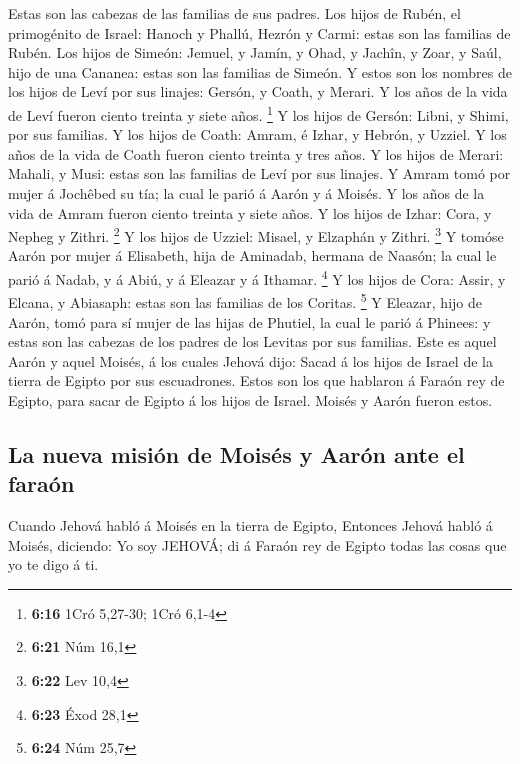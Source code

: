  Estas son las cabezas de las familias de sus padres. Los
hijos de Rubén, el primogénito de Israel: Hanoch y Phallú, Hezrón y
Carmi: estas son las familias de Rubén.  Los hijos de
Simeón: Jemuel, y Jamín, y Ohad, y Jachîn, y Zoar, y Saúl, hijo de una
Cananea: estas son las familias de Simeón.  Y estos son
los nombres de los hijos de Leví por sus linajes: Gersón, y Coath, y
Merari. Y los años de la vida de Leví fueron ciento treinta y siete
años. \footnote{\textbf{6:16} 1Cró 5,27-30; 1Cró 6,1-4} 
Y los hijos de Gersón: Libni, y Shimi, por sus familias. 
Y los hijos de Coath: Amram, é Izhar, y Hebrón, y Uzziel. Y los años de
la vida de Coath fueron ciento treinta y tres años.  Y
los hijos de Merari: Mahali, y Musi: estas son las familias de Leví por
sus linajes.  Y Amram tomó por mujer á Jochêbed su tía;
la cual le parió á Aarón y á Moisés. Y los años de la vida de Amram
fueron ciento treinta y siete años.  Y los hijos de
Izhar: Cora, y Nepheg y Zithri. \footnote{\textbf{6:21} Núm 16,1}
 Y los hijos de Uzziel: Misael, y Elzaphán y Zithri.
\footnote{\textbf{6:22} Lev 10,4}  Y tomóse Aarón por
mujer á Elisabeth, hija de Aminadab, hermana de Naasón; la cual le parió
á Nadab, y á Abiú, y á Eleazar y á Ithamar. \footnote{\textbf{6:23} Éxod
  28,1}  Y los hijos de Cora: Assir, y Elcana, y
Abiasaph: estas son las familias de los Coritas. \footnote{\textbf{6:24}
  Núm 25,7}  Y Eleazar, hijo de Aarón, tomó para sí mujer
de las hijas de Phutiel, la cual le parió á Phinees: y estas son las
cabezas de los padres de los Levitas por sus familias. 
Este es aquel Aarón y aquel Moisés, á los cuales Jehová dijo: Sacad á
los hijos de Israel de la tierra de Egipto por sus escuadrones.
 Estos son los que hablaron á Faraón rey de Egipto, para
sacar de Egipto á los hijos de Israel. Moisés y Aarón fueron estos.

\hypertarget{la-nueva-misiuxf3n-de-moisuxe9s-y-aaruxf3n-ante-el-farauxf3n}{%
\subsection{La nueva misión de Moisés y Aarón ante el
faraón}\label{la-nueva-misiuxf3n-de-moisuxe9s-y-aaruxf3n-ante-el-farauxf3n}}

 Cuando Jehová habló á Moisés en la tierra de Egipto,
 Entonces Jehová habló á Moisés, diciendo: Yo soy JEHOVÁ;
di á Faraón rey de Egipto todas las cosas que yo te digo á ti.

